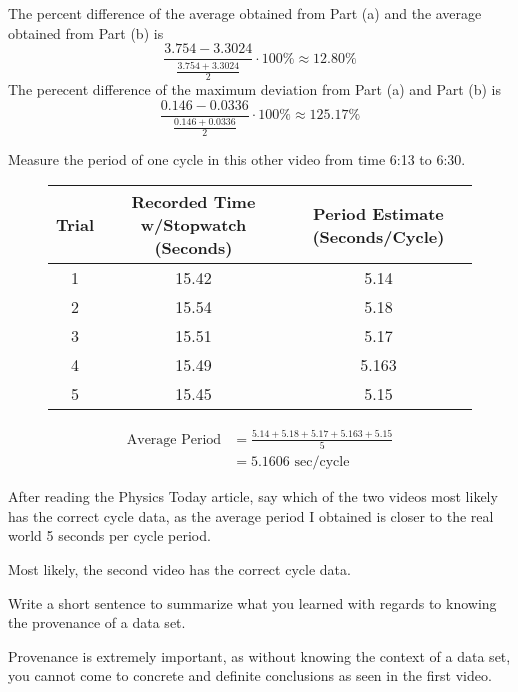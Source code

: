 \documentclass[11pt]{scrartcl}
\theoremstyle{dotlessP}
\theoremstyle{dotlessN}
\begin{document}
The percent difference of the average obtained from Part (a) and the average obtained from Part (b) is 
\[
	\frac{3.754 - 3.3024}{\frac{3.754 + 3.3024}{2}} \cdot 100\% \approx 12.80\%
\] 
The perecent difference of the maximum deviation from Part (a) and Part (b) is
\[
	\frac{0.146 - 0.0336}{\frac{0.146 + 0.0336}{2}} \cdot 100\% \approx 125.17\%
\] 
\begin{ques}
	Measure the period of one cycle in this other video from time 6:13 to 6:30.
\end{ques}
\begin{figure}[H]
	\centering
	\begin{tabular}{c|c|c}
		Trial & Recorded Time w/Stopwatch (Seconds) & Period Estimate (Seconds/Cycle) \\
		\hline
		1 & 15.42 & 5.14 \\
		2 & 15.54 & 5.18 \\
		3 & 15.51 & 5.17 \\
		4 & 15.49 & 5.163 \\
		5 & 15.45 & 5.15
	\end{tabular}
\end{figure}
\begin{align*}
	\text{Average Period} &= \frac{5.14 + 5.18 + 5.17 + 5.163 + 5.15}{5} \\
						  &= 5.1606 \text{ sec/cycle}
\end{align*}
\begin{ques}
After reading the Physics Today article, say which of the two videos most likely has the correct cycle data, as the average period I obtained is closer to the real world 5 seconds per cycle period.
\end{ques}
Most likely, the second video has the correct cycle data.
\begin{ques}
	Write a short sentence to summarize what you learned with regards to knowing the provenance of a data set.	
\end{ques}
Provenance is extremely important, as without knowing the context of a data set, you cannot come to concrete and definite conclusions as seen in the first video.
\end{document}
